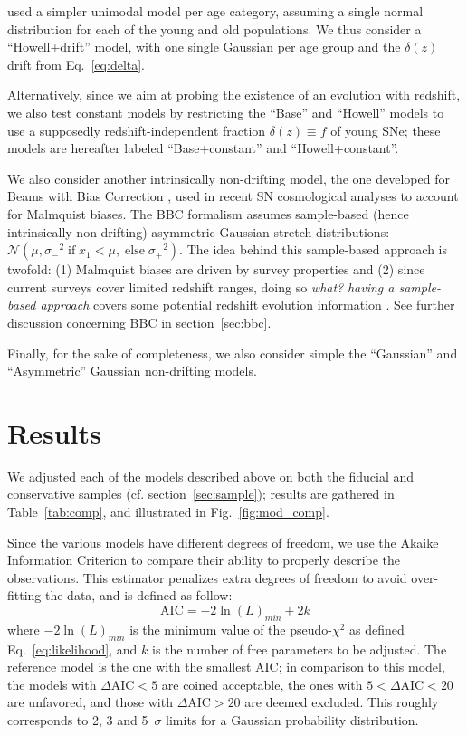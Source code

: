 \documentclass[]{aa} %
\newcommand{\nn}[1]{{\textcolor[rgb]{0.25, 0.50, 0}{#1}}}
\newcommand{\yc}[1]{{\textcolor{BrickRed}{#1}}}
\begin{document}
\cite{howell2007} used a simpler unimodal model per age category, assuming a
single normal distribution for each of the young and old populations.  We thus
consider a ``Howell+drift'' model, with one single Gaussian per age group and
the $\delta(z)$ drift from Eq.~\ref{eq:delta}.

Alternatively, since we aim at probing the existence of an evolution with
redshift, we also test constant models by restricting the ``Base'' and
``Howell'' models to use a supposedly redshift-independent fraction $\delta(z)
\equiv f$ of young SNe; these models are hereafter labeled ``Base+constant'' and
``Howell+constant''.

We also consider another intrinsically non-drifting model, the one developed for
Beams with Bias Correction \cite[BBC,][]{scolnic2016, kessler2017}, used in
recent SN cosmological analyses \cite[e.g.][]{scolnic2018a, descosmopaper2019,
riess2016, riess2019} to account for Malmquist biases. The BBC formalism assumes
sample-based (hence intrinsically non-drifting) asymmetric Gaussian stretch
distributions: $\mathcal{N}\left(\mu,
\sigma_-{}^2\;\text{if}\;x_1<\mu,\;\text{else}\;\sigma_+{}^2\right)$. The idea
behind this sample-based approach is twofold: (1) Malmquist biases are driven by
survey properties and (2) since current surveys cover limited redshift ranges,
doing so \yc{\textit{what?}} \nn{\textit{having a sample-based approach}} covers
some potential redshift evolution information \citep{scolnic2016, scolnic2018a}.
See further discussion concerning BBC in section~\ref{sec:bbc}. 

Finally, for the sake of completeness, we also consider simple the ``Gaussian''
and ``Asymmetric'' Gaussian non-drifting models. 

\section{Results}\label{sec:results}

We adjusted each of the models described above on both the fiducial and
conservative samples (cf. section~\ref{sec:sample}); results are gathered
in Table~\ref{tab:comp}, and illustrated in Fig.~\ref{fig:mod_comp}. 

Since the various models have different degrees of freedom, we use the Akaike
Information Criterion \citep[AIC, e.g.][]{burnham2004} to compare their ability
to properly describe the observations. This estimator penalizes extra degrees of
freedom to avoid over-fitting the data, and is defined as follow:
\begin{equation}
    \mathrm{AIC} = -2\ln(L)_{min} + 2k
\end{equation}
where $-2\ln(L)_{min}$ is the minimum value of the pseudo-$\chi^2$ as defined
Eq.~\eqref{eq:likelihood}, and $k$ is the number of free parameters to be
adjusted. The reference model is the one with the smallest AIC; in comparison to
this model, the models with $\Delta\mathrm{AIC}<5$ are coined acceptable,
the ones with $5<\Delta\mathrm{AIC}<20$ are unfavored, and those with
$\Delta\mathrm{AIC}>20$ are deemed excluded. This roughly corresponds to 2,
3 and 5~$\sigma$ limits for a Gaussian probability distribution.
\end{document}
